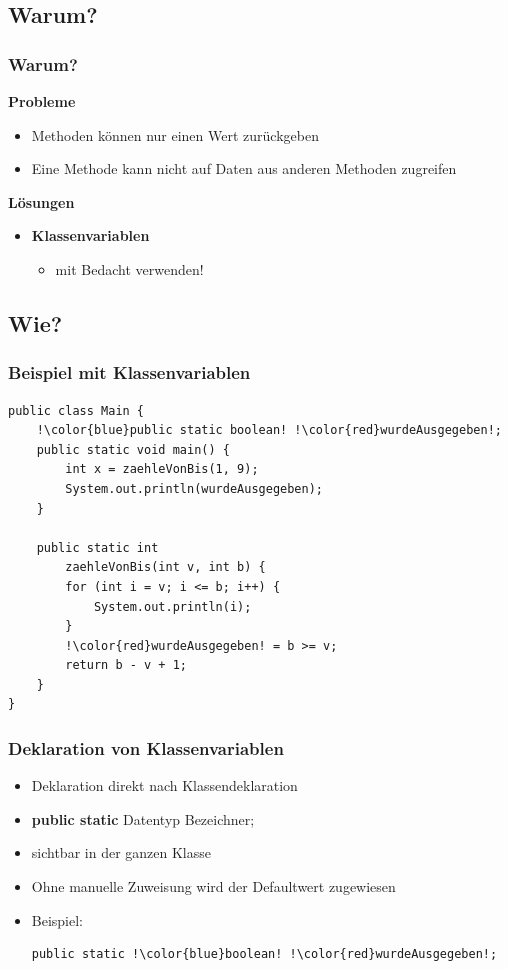 \documentclass[final]{beamer}
\begin{document}
\subsection{Warum?}
\begin{frame}
	\frametitle{Warum?}
	\textbf{Probleme}
	\begin{itemize}
		\item{Methoden können nur einen Wert zurückgeben}
		\item{Eine Methode kann nicht auf Daten aus anderen Methoden zugreifen}
	\end{itemize}
	\vspace{\baselineskip}
	\pause
	\textbf{Lösungen}
	\pause
	\begin{itemize}
		\item{\textbf{Klassenvariablen}
			\begin{itemize}
				\item{mit Bedacht verwenden!}
			\end{itemize}
		}
	\end{itemize}
\end{frame}
	
\subsection{Wie?}
\begin{frame}[containsverbatim]
	\frametitle{Beispiel mit Klassenvariablen}
	\begin{lstlisting}[escapechar=!]
public class Main {
	!\color{blue}public static boolean! !\color{red}wurdeAusgegeben!;
	public static void main() {
		int x = zaehleVonBis(1, 9);
		System.out.println(wurdeAusgegeben);
	}
	
	public static int 
		zaehleVonBis(int v, int b) {
		for (int i = v; i <= b; i++) {
			System.out.println(i);
		}
		!\color{red}wurdeAusgegeben! = b >= v;
		return b - v + 1;
	}
}
	\end{lstlisting}
\end{frame}

\begin{frame}[containsverbatim]
	\frametitle{Deklaration von Klassenvariablen}
	\begin{itemize}
		\item{Deklaration direkt nach Klassendeklaration}
		\item{\textbf{public static} {\color{blue}Datentyp} {\color{red}Bezeichner};}
		\item{sichtbar in der ganzen Klasse}
		\item{Ohne manuelle Zuweisung wird der Defaultwert zugewiesen}
		\item{Beispiel:
			\begin{lstlisting}[escapechar=!]
public static !\color{blue}boolean! !\color{red}wurdeAusgegeben!;
			\end{lstlisting}
		}
	\end{itemize}
\end{frame}
\end{document}
